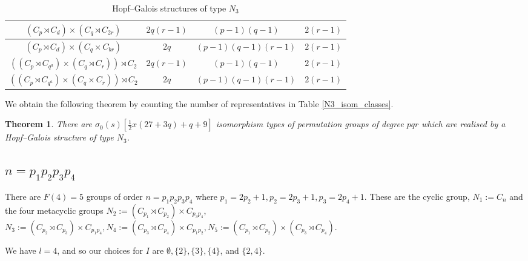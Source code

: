 \documentclass[a4paper,reqno]{amsart}
\newtheorem{theorem}{Theorem}[section]
\theoremstyle{definition}
\begin{document}
\begin{table}
{\begin{tabular}{|c|c|c|c|}
            \hline
            $(C_p \rtimes C_d) \times (C_q \rtimes C_{2r})$ & $2q(r-1)$ & $(p-1)(q-1)$ & $2(r-1)$\\
            \hline
            $(C_p \rtimes C_d) \times (C_q \times C_{br})$ & $2q$ & $(p-1)(q-1)(r-1)$ & $2(r-1)$\\
            \hline
            $((C_p \rtimes C_{q^a}) \times (C_q \rtimes C_r)) \rtimes C_2$ & $2q(r-1)$ & $(p-1)(q-1)$ & $2(r-1)$\\
            \hline
            $((C_p \rtimes C_{q^a}) \times (C_q \times C_r)) \rtimes C_2$ & $2q$ & $(p-1)(q-1)(r-1)$ & $2(r-1)$\\
            \hline
        \end{tabular}
        }
        \vspace{5mm}
        \caption{Hopf--Galois structures of type $N_3$}
        \label{N3_HGS}
\end{table}
We obtain the following theorem by counting the number of representatives in Table \ref{N3_isom_classes}.
\begin{theorem}\label{N3_tot}
    There are $\sigma_0(s)\left[\frac{1}{2}x(27+3q)+q+9\right]$ isomorphism types of permutation groups of degree $pqr$ which are realised by a Hopf--Galois structure of type $N_3$.
\end{theorem}

\newpage
\subsection{\texorpdfstring{$n=p_1p_2p_3p_4$}{n=p1p2p3p4}}
There are $F(4)=5$ groups of order $n=p_1p_2p_3p_4$ where $p_1=2p_2+1,p_2=2p_3+1,p_3=2p_4+1$. These are the cyclic group, $N_1:=C_n$ and the four metacyclic groups $N_2:=(C_{p_1}\rtimes C_{p_2}) \times C_{p_3p_4}$, $N_3:=(C_{p_2} \rtimes C_{p_3}) \times C_{p_1p_4}, N_4:=(C_{p_3} \rtimes C_{p_4}) \times C_{p_1p_2}, N_5:=(C_{p_1} \rtimes C_{p_2}) \times (C_{p_3} \rtimes C_{p_4})$.

We have $l=4$, and so our choices for $I$ are $\emptyset, \{2\}, \{3\}, \{4\}$, and $\{2,4\}$.
\end{document}
